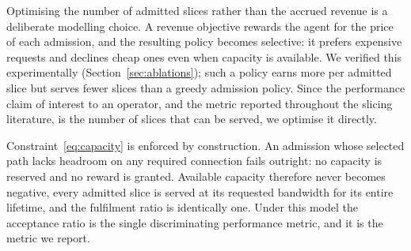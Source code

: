 \documentclass[10pt,journal,comsoc]{IEEEtran}
\begin{document}
Optimising the number of admitted slices rather than the accrued revenue
is a deliberate modelling choice. A revenue objective rewards the agent
for the price of each admission, and the resulting policy becomes
selective: it prefers expensive requests and declines cheap ones even
when capacity is available. We verified this experimentally
(Section~\ref{sec:ablations}); such a policy earns more per admitted
slice but serves fewer slices than a greedy admission policy. Since the
performance claim of interest to an operator, and the metric reported
throughout the slicing literature, is the number of slices that can be
served, we optimise it directly.

Constraint~\eqref{eq:capacity} is enforced by construction. An admission
whose selected path lacks headroom on any required connection fails
outright: no capacity is reserved and no reward is granted. Available
capacity therefore never becomes negative, every admitted slice is served
at its requested bandwidth for its entire lifetime, and the fulfilment
ratio is identically one. Under this model the acceptance ratio is the
single discriminating performance metric, and it is the metric we report.
\end{document}
